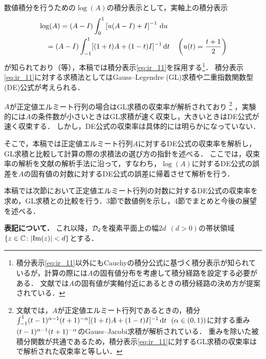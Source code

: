 \documentclass[12pt,a4paper,uplatex,dvipdfmx]{jsarticle}
\begin{document}
  数値積分を行うための$\log(A)$の積分表示として，実軸上の積分表示
  \begin{align}\label{eq:ir_01}
    &\log(A) = (A-I) \int_0^1 \left[{u(A-I) + I}\right]^{-1} \,\mathrm{d}{u}\\
    &\quad = (A-I) \int_{-1}^1 [(1+t)A + (1-t)I]^{-1} \,\mathrm{d}{t}
    \quad \left(u(t) = \frac{t+1}{2}\right)
    \label{eq:ir_11}
  \end{align}
  が知られており（\cite[Thm.\ 11.1]{higham_functions_2008}等），本稿では積分表示\eqref{eq:ir_11}を採用する\footnote{
    積分表示\eqref{eq:ir_11}以外にもCauchyの積分公式に基づく積分表示が知られているが，計算の際には$A$の固有値分布を考慮して積分経路を設定する必要がある．
    文献\cite{hale_computing_2008}では$A$の固有値が実軸付近にあるときの積分経路の決め方が提案されている．
  }．
  積分表示\eqref{eq:ir_11}に対する求積法としてはGauss--Legendre (GL)求積や二重指数関数型(DE)公式が考えられる．

  $A$が正定値エルミート行列の場合はGL求積の収束率が解析されており\cite{fasi_computing_2018}
  \footnote{%
    文献\cite{fasi_computing_2018}では，$A$が正定値エルミート行列であるときの，積分$\int_{-1}^1 (t-1)^{\alpha-1} (t+1)^{-\alpha} [(1+t)A + (1-t)I]^{-1} \,\mathrm{d}{t}\ \ (\alpha\in(0,1))$に対する重み$(t-1)^{\alpha-1} (t+1)^{-\alpha}$のGauss--Jacobi求積が解析されている．
    重みを除いた被積分関数が共通であるため，積分表示\eqref{eq:ir_11}に対するGL求積の収束率は\cite{fasi_computing_2018}で解析された収束率と等しい．
  }
  ，実験的には$A$の条件数が小さいときはGL求積が速く収束し，大きいときはDE公式が速く収束する\cite{tatsuoka_algorithms_2019}．
  しかし，DE公式の収束率は具体的には明らかになっていない．

  そこで，本稿では正定値エルミート行列$A$に対するDE公式の収束率を解析し，GL求積と比較して計算の際の求積法の選び方の指針を述べる．
  ここでは，収束率の解析を文献\cite{fasi_computing_2018}の解析手法に沿って，すなわち，$\log(A)$に対するDE公式の誤差を$A$の固有値の対数に対するDE公式の誤差に帰着させて解析を行う．

  本稿では次節において正定値エルミート行列の対数に対するDE公式の収束率を求め，GL求積との比較を行う．3節で数値例を示し，4節でまとめと今後の展望を述べる．

  \textbf{\sffamily 表記について．}
  これ以降，$\mathcal{D}_d$を複素平面上の幅$2d~~(d>0)$の帯状領域$\{z\in\mathbb{C}\colon |\mathrm{Im}(z)|<d\}$とする．
\end{document}

